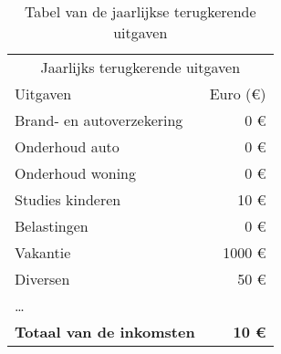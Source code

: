 \begin{table}[!htbp]
	\centering
	\begin{tabular}{@{}lr@{}}
		\toprule
		 \multicolumn{2}{c}{Jaarlijks terugkerende uitgaven}   \\
		\cmidrule(r){1-2}
		Uitgaven     &      Euro (\euro{}) \\ \midrule
		Brand- en autoverzekering        &           0 \euro{} \\
		Onderhoud auto                   &           0 \euro{} \\
		Onderhoud woning                 &           0 \euro{} \\
		Studies kinderen                 &          10 \euro{} \\
		Belastingen                      &           0 \euro{} \\
		Vakantie                         &        1000 \euro{} \\
		Diversen                         &          50 \euro{} \\
		\dots                            &  \\ \toprule
		\textbf{Totaal van de inkomsten} & \textbf{10 \euro{}} \\ \bottomrule
	\end{tabular}
	\caption{Tabel van de jaarlijkse terugkerende uitgaven}
	\label{tab:tabeljaarlijksterugkerendeuitgaven}
\end{table}